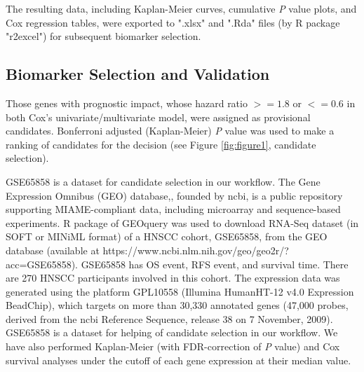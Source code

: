 \documentclass[jpm,article,submit,moreauthors,pdftex]{Definitions/mdpi}
\newenvironment{MyColorPar}[1]{%
    \leavevmode\color{#1}\ignorespaces%
}{%
}%
\begin{document}
\begin{paracol}{2}
The resulting data, including Kaplan-Meier curves, cumulative \textit{P} value plots, and Cox regression tables, were exported to ".xlsx" and ".Rda" files (by R package "r2excel") for subsequent biomarker selection.


\subsection{Biomarker Selection and Validation}
Those genes with prognostic impact, whose hazard ratio $>= 1.8$ or $<= 0.6$ in both Cox's univariate/multivariate model, were assigned as provisional candidates.
Bonferroni adjusted (Kaplan-Meier) \textit{P} value was used to make a ranking of candidates for the decision (see Figure \ref{fig:figure1}, candidate selection).

\begin{MyColorPar}{red}
GSE65858 is a dataset for candidate selection in our workflow.
The Gene Expression Omnibus (GEO) database\cite{Chung2006},, founded by \acrfull{ncbi}, is a public repository supporting MIAME-compliant data,  including microarray and sequence-based experiments.
R package of GEOquery\cite{Sean2007} was used to
download RNA-Seq dataset (in SOFT or MINiML format) of a HNSCC cohort, GSE65858, from the GEO database (available at https://www.ncbi.nlm.nih.gov/geo/geo2r/?\\acc=GSE65858). 
GSE65858\cite{Wichmann2015} has OS event, RFS event, and survival time.
There are 270 HNSCC participants involved in this cohort.
The expression data was generated using the platform GPL10558 (Illumina HumanHT-12 v4.0 Expression BeadChip), which targets on more than 30,330 annotated genes (47,000 probes, derived from the \acrshort{ncbi} Reference Sequence, release 38 on 7 November, 2009). %
GSE65858 is a dataset for helping of candidate selection in our workflow.
We have also performed Kaplan-Meier (with FDR-correction of \textit{P} value) and Cox survival analyses under the cutoff of each gene expression at their median value.
\end{MyColorPar} %





\end{paracol}
\end{document}
